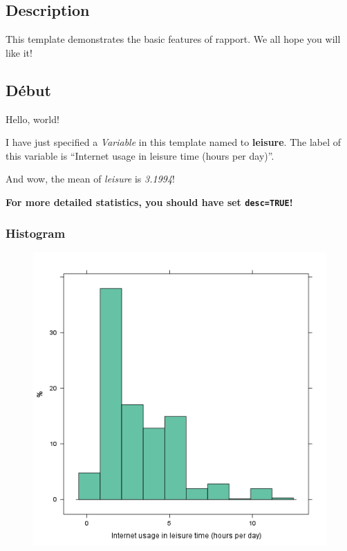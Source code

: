 \documentclass[]{article}
\makeatletter
\def\maxwidth{\ifdim\Gin@nat@width>\linewidth\linewidth
\else\Gin@nat@width\fi}
\let\Oldincludegraphics\includegraphics
\renewcommand{\includegraphics}[1]{\Oldincludegraphics[width=\maxwidth]{#1}}
\makeatother
\begin{document}
\subsection{Description}

This template demonstrates the basic features of rapport. We all hope
you will like it!

\subsection{Début}

Hello, world!

I have just specified a \emph{Variable} in this template named to
\textbf{leisure}. The label of this variable is ``Internet usage in
leisure time (hours per day)''.

And wow, the mean of \emph{leisure} is \emph{3.1994}!

\textbf{For more detailed statistics, you should have set
\texttt{desc=TRUE}!}

\subsubsection{Histogram}

\begin{figure}[htbp]
\centering
\includegraphics{f72d3b7413bcb88fce740c2ab229411a.png}
\caption{}
\end{figure}
\end{document}
